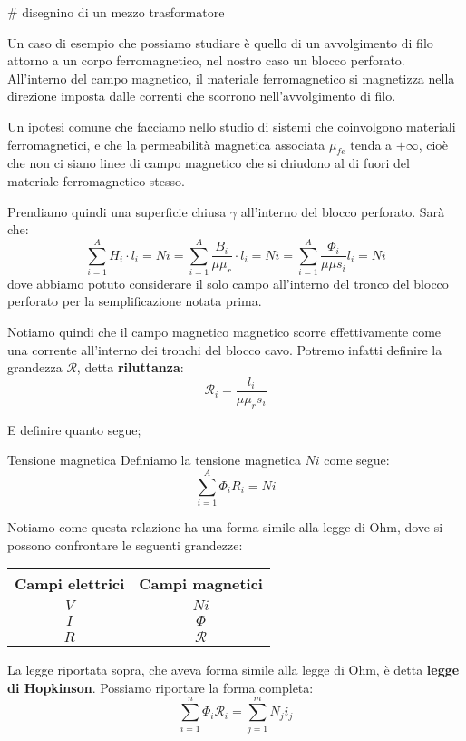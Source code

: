 \documentclass[a4paper,11pt]{article}
\begin{document}
\par\smallskip

# disegnino di un mezzo trasformatore

Un caso di esempio che possiamo studiare è quello di un avvolgimento di filo attorno a un corpo ferromagnetico, nel nostro caso un blocco perforato.
All'interno del campo magnetico, il materiale ferromagnetico si magnetizza nella direzione imposta dalle correnti che scorrono nell'avvolgimento di filo.

Un ipotesi comune che facciamo nello studio di sistemi che coinvolgono materiali ferromagnetici, e che la permeabilità magnetica associata $\mu_{fe}$ tenda a $+\infty$, cioè che non ci siano linee di campo magnetico che si chiudono al di fuori del materiale ferromagnetico stesso.

Prendiamo quindi una superficie chiusa $\gamma$ all'interno del blocco perforato.
Sarà che:
$$
\sum_{i=1}^A H_i \cdot l_i = N i = \sum_{i=1}^A \frac{B_i}{\mu \mu_r} \cdot l_i = N i = \sum_{i=1}^A \frac{\Phi_i}{\mu \mu s_i} l_i = Ni
$$
dove abbiamo potuto considerare il solo campo all'interno del tronco del blocco perforato per la semplificazione notata prima.

Notiamo quindi che il campo magnetico magnetico scorre effettivamente come una corrente all'interno dei tronchi del blocco cavo.
Potremo infatti definire la grandezza $\mathcal{R}$, detta \textbf{riluttanza}:
$$
\mathcal{R}_i = \frac{l_i}{\mu \mu_r s_i}
$$

E definire quanto segue; 
\begin{definition}{Tensione magnetica}
	Definiamo la tensione magnetica $Ni$ come segue:
	$$
	\sum_{i=1}^A \Phi_i R_i = N i
	$$
\end{definition}

Notiamo come questa relazione ha una forma simile alla legge di Ohm, dove si possono confrontare le seguenti grandezze:
\begin{table}[h!]
	\center {}
	\begin{tabular} { c | c }
		\bfseries Campi elettrici & \bfseries Campi magnetici \\ 
		\hline
		$V$ & $N i$ \\ 
		$I$ & $\Phi$ \\ 
		$R$ & $\mathcal{R}$ \\ 
	\end{tabular}
\end{table}

La legge riportata sopra, che aveva forma simile alla legge di Ohm, è detta \textbf{legge di Hopkinson}.
Possiamo riportare la forma completa:
$$
\sum_{i=1}^n \Phi_i \mathcal{R}_i = \sum_{j=1}^m N_j i_j
$$
\end{document}
